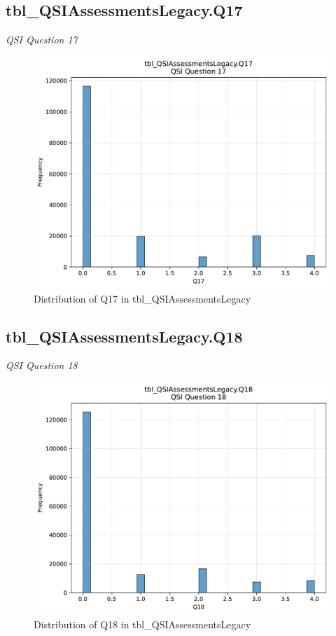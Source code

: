 \subsection{tbl\_QSIAssessmentsLegacy.Q17}
\textit{QSI Question 17}

\begin{figure}[htbp]
\centering
\includegraphics[width=\textwidth]{figures/dbo_tbl_QSIAssessmentsLegacy_Q17.pdf}
\caption{Distribution of Q17 in tbl\_QSIAssessmentsLegacy}
\end{figure}\newpage

\subsection{tbl\_QSIAssessmentsLegacy.Q18}
\textit{QSI Question 18}

\begin{figure}[htbp]
\centering
\includegraphics[width=\textwidth]{figures/dbo_tbl_QSIAssessmentsLegacy_Q18.pdf}
\caption{Distribution of Q18 in tbl\_QSIAssessmentsLegacy}
\end{figure}\newpage

